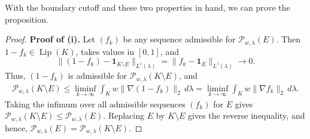 \documentclass[11pt]{article}
\theoremstyle{definition}
\theoremstyle{remark}
\newcommand{\Lip}{\operatorname{Lip}}
\newcommand{\cP}{\mathcal P}
\newcommand{\one}{\mathbf 1}
\begin{document}
With the boundary cutoff and these two properties in hand, we can prove
the proposition.

\propperimeter*

\begin{proof}

\textbf{Proof of \textup{(i)}.} Let $(f_k)$ be any sequence admissible for $\cP_{w,\lambda}(E)$.  Then $1-f_k\in\Lip(K)$, takes values in $[0,1]$, and
\[
 \|(1-f_k)-\one_{K\setminus E}\|_{L^1(\lambda)}
 =\|f_k-\one_E\|_{L^1(\lambda)}
 \longrightarrow0.
\]
Thus, $(1-f_k)$ is admissible for $\cP_{w,\lambda}(K\setminus E)$, and
\begin{align*}
    \cP_{w,\lambda}(K\setminus E)\leq \liminf_{k\to\infty} \int_K w\|\nabla (1-f_k)\|_2\,d\lambda = \liminf_{k\to\infty} \int_K w\|\nabla f_k\|_2\,d\lambda.
\end{align*}
Taking the infimum over all admissible sequences $(f_k)$ for $E$ gives $\cP_{w,\lambda}(K\setminus E)\le\cP_{w,\lambda}(E)$.  Replacing $E$ by $K\setminus E$ gives the reverse inequality, and hence, $\cP_{w,\lambda}(E)=\cP_{w,\lambda}(K\setminus E)$.


\end{proof}
\end{document}
